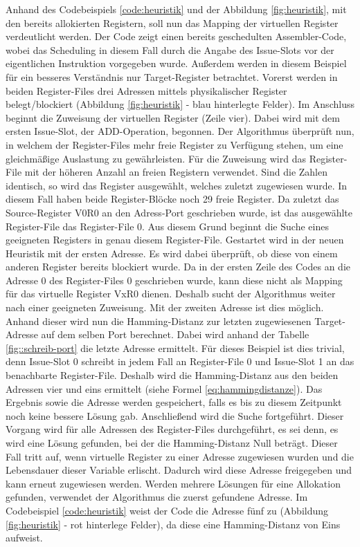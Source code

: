 Anhand des Codebeispiels \ref{code:heuristik} und der Abbildung \ref{fig:heuristik}, mit den bereits allokierten Registern, soll nun das Mapping der virtuellen Register verdeutlicht werden.
Der Code zeigt einen bereits geschedulten Assembler-Code, wobei das Scheduling in diesem Fall durch die Angabe des Issue-Slots vor der eigentlichen Instruktion vorgegeben wurde. Außerdem werden in diesem Beispiel für ein besseres Verständnis nur Target-Register betrachtet.
Vorerst werden in beiden Register-Files drei Adressen mittels physikalischer Register belegt/blockiert (Abbildung \ref{fig:heuristik} - blau hinterlegte Felder). Im Anschluss beginnt die Zuweisung der virtuellen Register (Zeile vier).
Dabei wird mit dem ersten Issue-Slot, der ADD-Operation, begonnen. Der Algorithmus überprüft nun, in welchem der Register-Files mehr freie Register zu Verfügung stehen, um eine gleichmäßige Auslastung zu gewährleisten. Für die Zuweisung wird das Register-File mit der höheren Anzahl an freien Registern verwendet. Sind die Zahlen identisch, so wird das Register ausgewählt, welches zuletzt zugewiesen wurde. In diesem Fall haben beide Register-Blöcke noch 29 freie Register. Da zuletzt das Source-Register V0R0 an den Adress-Port geschrieben wurde, ist das ausgewählte Register-File das Register-File 0.
Aus diesem Grund beginnt die Suche eines geeigneten Registers in genau diesem Register-File. Gestartet wird in der neuen Heuristik mit der ersten Adresse. Es wird dabei überprüft, ob diese von einem anderen Register bereits blockiert wurde. Da in der ersten Zeile des Codes an die Adresse 0 des Register-Files 0 geschrieben wurde, kann diese nicht als Mapping für das virtuelle Register VxR0 dienen. Deshalb sucht der Algorithmus weiter nach einer geeigneten Zuweisung. Mit der zweiten Adresse ist dies möglich. Anhand dieser wird nun die Hamming-Distanz zur letzten zugewiesenen Target-Adresse auf dem selben Port berechnet. Dabei wird anhand der Tabelle \ref{fig::schreib-port} die letzte Adresse ermittelt. Für dieses Beispiel ist dies trivial, denn Issue-Slot 0 schreibt in jedem Fall an Register-File 0 und Issue-Slot 1 an das benachbarte Register-File. Deshalb wird die Hamming-Distanz aus den beiden Adressen vier und eins ermittelt (siehe Formel \ref{eq:hammingdistanze}). Das Ergebnis sowie die Adresse werden gespeichert, falls es bis zu diesem Zeitpunkt noch keine bessere Lösung gab. Anschließend wird die Suche fortgeführt. Dieser Vorgang wird für alle Adressen des Register-Files durchgeführt, es sei denn, es wird eine Lösung gefunden, bei der die Hamming-Distanz Null beträgt. Dieser Fall tritt auf, wenn virtuelle Register zu einer Adresse zugewiesen wurden und die Lebensdauer dieser Variable erlischt. Dadurch wird diese Adresse freigegeben und kann erneut zugewiesen werden.  Werden mehrere Lösungen für eine Allokation gefunden, verwendet der Algorithmus die zuerst gefundene Adresse. Im Codebeispiel \ref{code:heuristik} weist der Code die Adresse fünf zu (Abbildung \ref{fig:heuristik} - rot hinterlege Felder), da diese eine Hamming-Distanz von Eins aufweist.
